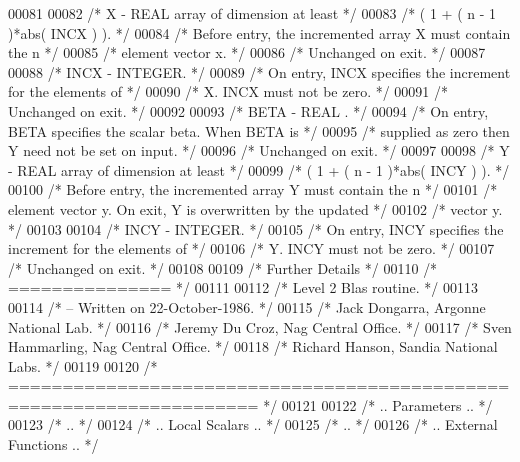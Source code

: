 \begin{DoxyCode}
00081 
00082 \textcolor{comment}{/*  X      - REAL             array of dimension at least */}
00083 \textcolor{comment}{/*           ( 1 + ( n - 1 )*abs( INCX ) ). */}
00084 \textcolor{comment}{/*           Before entry, the incremented array X must contain the n */}
00085 \textcolor{comment}{/*           element vector x. */}
00086 \textcolor{comment}{/*           Unchanged on exit. */}
00087 
00088 \textcolor{comment}{/*  INCX   - INTEGER. */}
00089 \textcolor{comment}{/*           On entry, INCX specifies the increment for the elements of */}
00090 \textcolor{comment}{/*           X. INCX must not be zero. */}
00091 \textcolor{comment}{/*           Unchanged on exit. */}
00092 
00093 \textcolor{comment}{/*  BETA   - REAL            . */}
00094 \textcolor{comment}{/*           On entry, BETA specifies the scalar beta. When BETA is */}
00095 \textcolor{comment}{/*           supplied as zero then Y need not be set on input. */}
00096 \textcolor{comment}{/*           Unchanged on exit. */}
00097 
00098 \textcolor{comment}{/*  Y      - REAL             array of dimension at least */}
00099 \textcolor{comment}{/*           ( 1 + ( n - 1 )*abs( INCY ) ). */}
00100 \textcolor{comment}{/*           Before entry, the incremented array Y must contain the n */}
00101 \textcolor{comment}{/*           element vector y. On exit, Y is overwritten by the updated */}
00102 \textcolor{comment}{/*           vector y. */}
00103 
00104 \textcolor{comment}{/*  INCY   - INTEGER. */}
00105 \textcolor{comment}{/*           On entry, INCY specifies the increment for the elements of */}
00106 \textcolor{comment}{/*           Y. INCY must not be zero. */}
00107 \textcolor{comment}{/*           Unchanged on exit. */}
00108 
00109 \textcolor{comment}{/*  Further Details */}
00110 \textcolor{comment}{/*  =============== */}
00111 
00112 \textcolor{comment}{/*  Level 2 Blas routine. */}
00113 
00114 \textcolor{comment}{/*  -- Written on 22-October-1986. */}
00115 \textcolor{comment}{/*     Jack Dongarra, Argonne National Lab. */}
00116 \textcolor{comment}{/*     Jeremy Du Croz, Nag Central Office. */}
00117 \textcolor{comment}{/*     Sven Hammarling, Nag Central Office. */}
00118 \textcolor{comment}{/*     Richard Hanson, Sandia National Labs. */}
00119 
00120 \textcolor{comment}{/*  ===================================================================== */}
00121 
00122 \textcolor{comment}{/*     .. Parameters .. */}
00123 \textcolor{comment}{/*     .. */}
00124 \textcolor{comment}{/*     .. Local Scalars .. */}
00125 \textcolor{comment}{/*     .. */}
00126 \textcolor{comment}{/*     .. External Functions .. */}

\end{DoxyCode}
